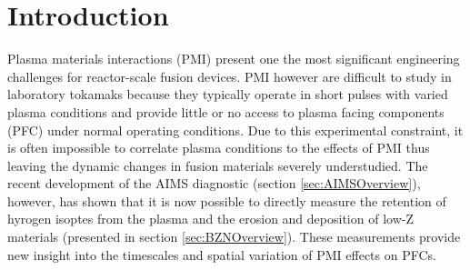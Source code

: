 \documentclass[final,3p,times,twocolumn]{elsarticle}
\begin{document}
\begin{frontmatter}
\begin{abstract}
\end{abstract}

\begin{keyword}


\end{keyword}

\end{frontmatter}

\section{Introduction}

Plasma materials interactions (PMI) present one the most significant engineering challenges for reactor-scale fusion devices. PMI however are difficult to study in laboratory tokamaks because they typically operate in short pulses with varied plasma conditions and provide little or no access to plasma facing components (PFC) under normal operating conditions. Due to this experimental constraint, it is often impossible to correlate plasma conditions to the effects of PMI thus leaving the dynamic changes in fusion materials severely understudied.  The recent development of the AIMS diagnostic \cite{RSIPaper} (section \ref{sec:AIMSOverview}), however, has shown that it is now possible to directly measure the retention of hyrogen isoptes from the plasma \cite{HartwigDRetention} and the erosion and deposition of low-Z materials (presented in section \ref{sec:BZNOverview}). These measurements provide new insight into the timescales and spatial variation of PMI effects on PFCs. 
\end{document}

